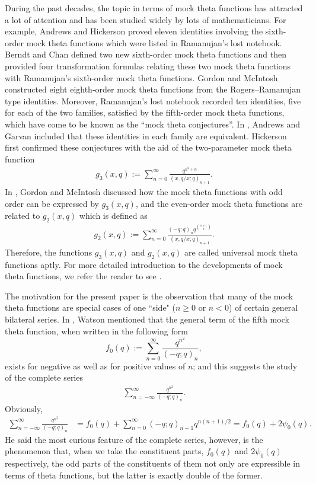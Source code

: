 \documentclass[10pt,a4paper]{amsart}
\numberwithin{equation}{section}
\begin{document}
During the past decades, the topic in terms of mock theta functions has attracted a lot of attention and has been studied widely by lots of mathematicians. For example, Andrews and Hickerson \cite{AH} proved eleven identities involving the sixth-order mock
theta functions which were listed in Ramanujan's lost notebook. Berndt and Chan
 \cite{BC} defined two new sixth-order mock theta functions and then provided four transformation formulas relating these two mock theta functions with Ramanujan's sixth-order mock theta functions. Gordon and McIntosh~\cite{GM2} constructed eight eighth-order mock theta
functions from the Rogers--Ramanujan type identities. Moreover, Ramanujan's lost notebook \cite{R} recorded ten identities, five for each of the two families, satisfied by the fifth-order mock theta functions, which have come to be known as the ``mock theta conjectures''. In \cite{AG}, Andrews and Garvan included that these identities in each family are equivalent.
Hickerson \cite{H} first confirmed these conjectures with the aid of the two-parameter mock theta function
\begin{align}\label{g3}
g_3(x,q):=\sum_{n=0}^{\infty}\frac{q^{n^2+n}}{(x,q/x;q)_{n+1}}.
\end{align}
In \cite{GM}, Gordon and McIntosh discussed how the mock theta functions with odd order can be expressed by $g_3(x,q)$,
and the even-order mock theta functions are related to $g_2(x,q)$ which is defined as
\begin{align*}
g_2(x,q):=\sum_{n=0}^{\infty}\frac{(-q;q)_nq^{n+1\choose2}}
{(x,q/x;q)_{n+1}}.
\end{align*}
Therefore, the functions $g_3(x,q)$ and $g_2(x,q)$ are called universal mock theta functions aptly. For more detailed introduction to the developments of mock theta functions, we refer the reader to see \cite{GM}.


The motivation for the present paper is the observation that
many of the mock theta functions are special cases of one ``side" ($n \geq 0$ or $n < 0$)
of certain general bilateral series. In \cite{W2}, Watson mentioned that the general term of the fifth mock theta function, when written in the following form
\[
f_{0}(q):=\sum_{n=0}^{\infty}\frac{q^{n^2}}{(-q;q)_n},
\]
exists for negative as well as for positive values of $n$; and this suggests the study of the complete series
\begin{align}\label{bf}
\sum_{n=-\infty}^{\infty}\frac{q^{n^2}}{(-q;q)_n}.
\end{align}
Obviously,
\begin{align*}
\sum_{n=-\infty}^{\infty}\frac{q^{n^2}}{(-q;q)_n}&=f_0(q)+\sum_{n=0}^{\infty}(-q;q)_{n-1}q^{n(n+1)/2}=f_0(q)+2\psi_{0}(q).
\end{align*}
He said the most curious feature of the complete series, however, is the phenomenon that, when we take the constituent parts, $f_{0}(q)$ and $2\psi_{0}(q)$ respectively, the odd parts of the constituents of them
 not only are expressible in terms of theta functions, but the latter is exactly double of the former.
\end{document}
